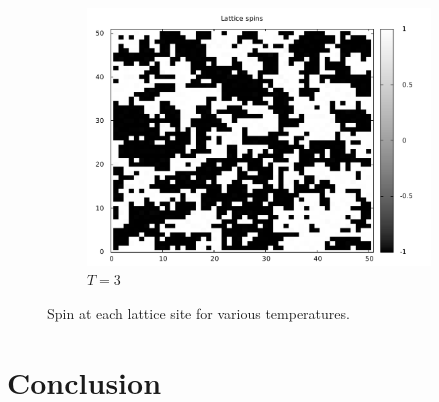 \documentclass[]{article}
\begin{document}
\begin{figure}[ht!]
\begin{subfigure}[b]{0.3\linewidth}
  \includegraphics[width=\textwidth]{figures/spin_T_eq_3.pdf}
  \caption{$T=3$}
  \label{fig:spin_t_eq_3}
 \end{subfigure}
 
 \label{fig:spins}
 \caption{Spin at each lattice site for various temperatures.}
\end{figure}

\section{Conclusion}
\end{document}

